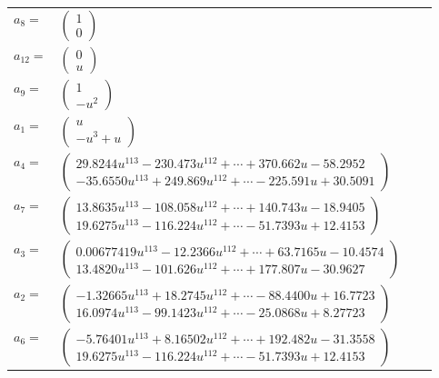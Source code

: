 \documentclass[1p]{elsarticle_modified}
\theoremstyle{definition}
\begin{document}
\begin{tabular}{m{7pt} m{180pt} m{7pt} m{180pt} }
\flushright $a_{8}=$&$\begin{pmatrix}1\\0\end{pmatrix}$ \\
\flushright $a_{12}=$&$\begin{pmatrix}0\\u\end{pmatrix}$ \\
\flushright $a_{9}=$&$\begin{pmatrix}1\\- u^2\end{pmatrix}$ \\
\flushright $a_{1}=$&$\begin{pmatrix}u\\- u^3+u\end{pmatrix}$ \\
\flushright $a_{4}=$&$\begin{pmatrix}29.8244 u^{113}-230.473 u^{112}+\cdots+370.662 u-58.2952\\-35.6550 u^{113}+249.869 u^{112}+\cdots-225.591 u+30.5091\end{pmatrix}$ \\
\flushright $a_{7}=$&$\begin{pmatrix}13.8635 u^{113}-108.058 u^{112}+\cdots+140.743 u-18.9405\\19.6275 u^{113}-116.224 u^{112}+\cdots-51.7393 u+12.4153\end{pmatrix}$ \\
\flushright $a_{3}=$&$\begin{pmatrix}0.00677419 u^{113}-12.2366 u^{112}+\cdots+63.7165 u-10.4574\\13.4820 u^{113}-101.626 u^{112}+\cdots+177.807 u-30.9627\end{pmatrix}$ \\
\flushright $a_{2}=$&$\begin{pmatrix}-1.32665 u^{113}+18.2745 u^{112}+\cdots-88.4400 u+16.7723\\16.0974 u^{113}-99.1423 u^{112}+\cdots-25.0868 u+8.27723\end{pmatrix}$ \\
\flushright $a_{6}=$&$\begin{pmatrix}-5.76401 u^{113}+8.16502 u^{112}+\cdots+192.482 u-31.3558\\19.6275 u^{113}-116.224 u^{112}+\cdots-51.7393 u+12.4153\end{pmatrix}$ \\

\end{tabular}
\end{document}
